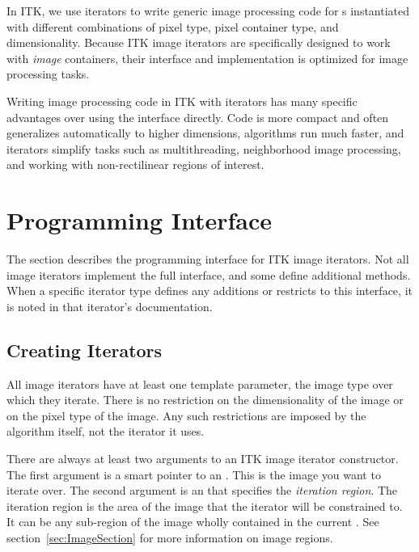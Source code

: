 In ITK, we use iterators to write generic image processing code for
s instantiated with different combinations of pixel type, pixel
container type, and dimensionality.  Because ITK image iterators are
specifically designed to work with \emph{image} containers, their interface and
implementation is optimized for image processing tasks.

Writing image processing code in ITK with iterators has many specific
advantages over using the  interface directly.  Code is more
compact and often generalizes automatically to higher dimensions, algorithms
run much faster, and iterators simplify tasks such as multithreading,
neighborhood image processing, and working with non-rectilinear regions of
interest.


\section{Programming Interface}
\label{sec:IteratorsInterface}

The section describes the programming interface for ITK image iterators.  Not
all image iterators implement the full interface, and some define additional
methods.  When a specific iterator type defines any additions or restricts to this
interface, it is noted in that iterator's documentation.

\subsection{Creating Iterators}
\label{sec:CreatingIterators}
All image iterators have at least one template parameter, the image type over
which they iterate.  There is no restriction on the dimensionality of the image
or on the pixel type of the image.  Any such restrictions are imposed by the
algorithm itself, not the iterator it uses.

There are always at least two arguments to an ITK image iterator constructor.
The first argument is a smart pointer to an .  This is the
image you want to iterate over. The second argument is an
 that specifies the \emph{iteration region}.  The
iteration region is the area of the image that the iterator will be constrained
to. It can be any sub-region of the image wholly contained in the current
.  See section~\ref{sec:ImageSection} for more information
on image regions. 

